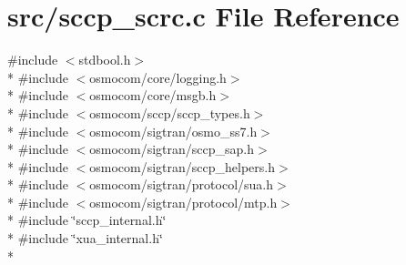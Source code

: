 \section{src/sccp\+\_\+scrc.c File Reference}
\label{sccp__scrc_8c}
{\ttfamily \#include $<$stdbool.\+h$>$}\\*
{\ttfamily \#include $<$osmocom/core/logging.\+h$>$}\\*
{\ttfamily \#include $<$osmocom/core/msgb.\+h$>$}\\*
{\ttfamily \#include $<$osmocom/sccp/sccp\+\_\+types.\+h$>$}\\*
{\ttfamily \#include $<$osmocom/sigtran/osmo\+\_\+ss7.\+h$>$}\\*
{\ttfamily \#include $<$osmocom/sigtran/sccp\+\_\+sap.\+h$>$}\\*
{\ttfamily \#include $<$osmocom/sigtran/sccp\+\_\+helpers.\+h$>$}\\*
{\ttfamily \#include $<$osmocom/sigtran/protocol/sua.\+h$>$}\\*
{\ttfamily \#include $<$osmocom/sigtran/protocol/mtp.\+h$>$}\\*
{\ttfamily \#include \char`\"{}sccp\+\_\+internal.\+h\char`\"{}}\\*
{\ttfamily \#include \char`\"{}xua\+\_\+internal.\+h\char`\"{}}\\*
